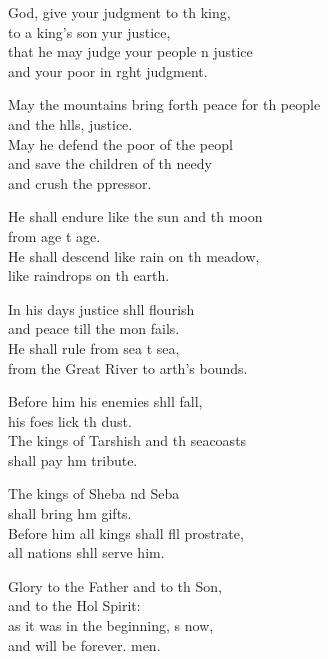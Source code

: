 \settowidth{\versewidth}{May the mountains bring forth peace for the people *}
\begin{psalmverse}%
  \begin{patverse}
 God, give your judgment to th king,\Med\\
to a king’s son yur justice,\\
that he may judge your people \pointup{\i}n justice\Med\\
and your poor in r\pointup{\i}ght judgment.

May the mountains bring forth peace for th people\Med\\
and the h\pointup{\i}lls, justice.\\
May he defend the poor of the peopl\Flex\\
and save the children of th needy\Med\\
and crush the ppressor.

He shall endure like the sun and th moon\Med\\
from age t age.\\
He shall descend like rain on th meadow,\Med\\
like raindrops on th earth.

In his days justice shll flourish\Med\\
and peace till the mon fails.\\
He shall rule from sea t sea,\Med\\
from the Great River to arth’s bounds.

Before him his enemies shll fall,\Med\\
his foes lick th dust.\\
The kings of Tarshish and th seacoasts\Med\\
shall pay h\pointup{\i}m tribute.

The kings of Sheba nd Seba\Med\\
shall bring h\pointup{\i}m gifts.\\
Before him all kings shall fll prostrate,\Med\\
all nations shll serve him.

Glory to the Father and to th Son,\Med\\
and to the Hol Spirit:\\
as it was in the beginning, \pointup{\i}s now,\Med\\
and will be forever. men.
  \end{patverse}
\end{psalmverse}
